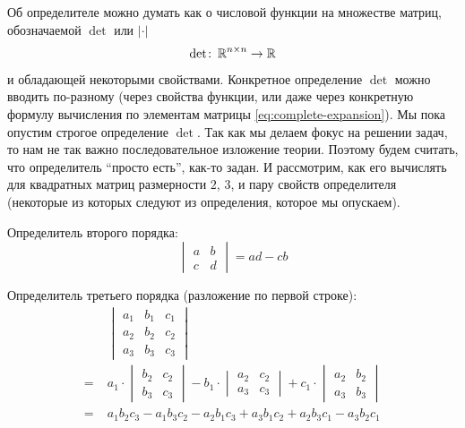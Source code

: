 \documentclass[a4paper,12pt]{article}
\begin{document}
  Об определителе можно думать как о числовой функции на множестве матриц, обозначаемой $\det$ или $|\cdot|$
  \[
    \det \colon \operatorname{\mathbb R}^{n\times n} \to \operatorname{\mathbb R}
  \]
  и обладающей некоторыми свойствами.
  Конкретное определение $\det$ можно вводить по-разному (через свойства функции, или даже через конкретную формулу вычисления по элементам матрицы \ref{eq:complete-expansion}).
  Мы пока опустим строгое определение $\det$.
  Так как мы делаем фокус на решении задач, то нам не так важно последовательное изложение теории.
  Поэтому будем считать, что определитель ``просто есть'', как-то задан.
  И рассмотрим, как его вычислять для квадратных матриц размерности $2$, $3$, и пару свойств определителя (некоторые из которых следуют из определения, которое мы опускаем).
  
  \begin{example}
    Определитель второго порядка:
    \[
      \begin{vmatrix}
        a & b\\
        c & d
      \end{vmatrix} = ad - cb
    \]
  \end{example}

  \begin{example}
    Определитель третьего порядка (разложение по первой строке):
    \begin{equation*}
    \begin{split}
      &\begin{vmatrix}
        a_1 & b_1 & c_1\\
        a_2 & b_2 & c_2\\
        a_3 & b_3 & c_3
      \end{vmatrix}\\
        =\; &a_1 \cdot \begin{vmatrix}b_2 & c_2\\b_3 & c_3\end{vmatrix}
        - b_1 \cdot \begin{vmatrix}a_2 & c_2\\a_3 & c_3\end{vmatrix}
        + c_1 \cdot \begin{vmatrix}a_2 & b_2\\a_3 & b_3\end{vmatrix}\\
        =\; &a_1 b_2 c_3 - a_1 b_3 c_2 - a_2 b_1 c_3 + a_3 b_1 c_2 + a_2 b_3 c_1 - a_3 b_2 c_1
    \end{split}
    \end{equation*}
  \end{example}
  
\end{document}

